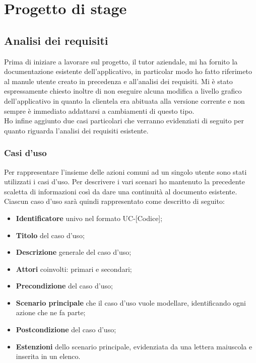 
\chapter{Progetto di stage}
\label{cap:progetto-stage}

\section{Analisi dei requisiti}

Prima di iniziare a lavorare sul progetto, il tutor aziendale, mi ha fornito la documentazione esistente dell'applicativo, in particolar modo ho fatto riferimeto al manule
utente creato in precedenza e all'analisi dei requisiti. Mi è stato espressamente chiesto inoltre di non eseguire alcuna modifica a livello grafico dell'applicativo in quanto 
la clientela era abituata alla versione corrente e non sempre è immediato addattarsi a cambiamenti di questo tipo.\\
Ho infine aggiunto due casi particolari che verranno evidenziati di seguito per quanto riguarda l'analisi dei requisiti esistente.


\subsection{Casi d'uso}

Per rappresentare l'insieme delle azioni comuni ad un singolo utente sono stati utilizzati i casi d'uso.
Per descrivere i vari scenari ho mantenuto la precedente scaletta di informazioni così da dare una continuità al documento esistente. 
Ciascun caso d'uso sarà quindi rappresentato come descritto di seguito:
\begin{itemize}
    \item \textbf{Identificatore} univo nel formato UC-[Codice];
    \item \textbf{Titolo} del caso d'uso;
    \item \textbf{Descrizione} generale del caso d'uso;
    \item \textbf{Attori} coinvolti: primari e secondari;
    \item \textbf{Precondizione} del caso d'uso;
    \item \textbf{Scenario principale} che il caso d'uso vuole modellare, identificando ogni azione che ne fa parte;
    \item \textbf{Postcondizione} del caso d'uso;
    \item \textbf{Estenzioni} dello scenario principale, evidenziata da una lettera maiuscola e inserita in un elenco.
\end{itemize}

